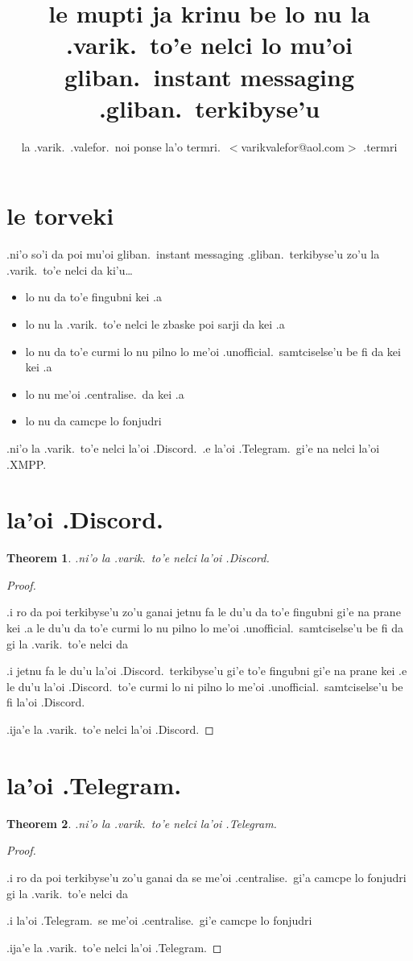 \documentclass{article}
\title{le mupti ja krinu be lo nu la .varik.\ to'e nelci lo mu'oi gliban.\ instant messaging .gliban.\ terkibyse'u}
\author{la .varik.\ .valefor.\ noi ponse la'o termri.\ $<$varikvalefor@aol.com$>$ .termri}
\newtheorem{thm}{Theorem}
\begin{document}
\maketitle

\section{le torveki}
.ni'o so'i da poi mu'oi gliban.\ instant messaging .gliban.\ terkibyse'u zo'u la .varik.\ to'e nelci da ki'u\ldots
\begin{itemize}
	\item lo nu da to'e fingubni kei .a
	\item lo nu la .varik.\ to'e nelci le zbaske poi sarji da kei .a
	\item lo nu da to'e curmi lo nu pilno lo me'oi .unofficial.\ samtciselse'u be fi da kei kei .a
	\item lo nu me'oi .centralise.\ da kei .a
	\item lo nu da camcpe lo fonjudri
\end{itemize}

.ni'o la .varik.\ to'e nelci la'oi .Discord.\ .e la'oi .Telegram.\ gi'e na nelci la'oi .XMPP.
\section{la'oi .Discord.}
\begin{thm}
	.ni'o la .varik.\ to'e nelci la'oi .Discord.
\end{thm}
\begin{proof}
	${}$

	.i ro da poi terkibyse'u zo'u ganai jetnu fa le du'u da to'e fingubni gi'e na prane kei .a le du'u da to'e curmi lo nu pilno lo me'oi .unofficial.\ samtciselse'u be fi da gi la .varik.\ to'e nelci da

	.i jetnu fa le du'u la'oi .Discord.\ terkibyse'u gi'e to'e fingubni gi'e na prane kei .e le du'u la'oi .Discord.\ to'e curmi lo ni pilno lo me'oi .unofficial.\ samtciselse'u be fi la'oi .Discord.

	.ija'e la .varik.\ to'e nelci la'oi .Discord.
\end{proof}

\section{la'oi .Telegram.}
\begin{thm}
	.ni'o la .varik.\ to'e nelci la'oi .Telegram.
\end{thm}
\begin{proof}
	${}$

	.i ro da poi terkibyse'u zo'u ganai da se me'oi .centralise.\ gi'a camcpe lo fonjudri gi la .varik.\ to'e nelci da

	.i la'oi .Telegram.\ se me'oi .centralise.\ gi'e camcpe lo fonjudri

	.ija'e la .varik.\ to'e nelci la'oi .Telegram.
\end{proof}
\end{document}
